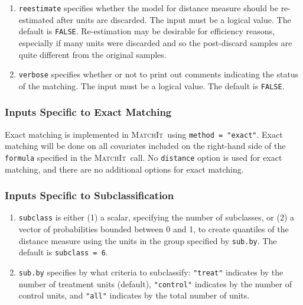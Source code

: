 \documentclass[oneside,letterpaper,titlepage]{article}
\newcommand{\MatchIt}{\textsc{MatchIt}}
\begin{document}
\begin{enumerate}
\item \texttt{reestimate} specifies whether the model for distance
  measure should be re-estimated after units are discarded. The input
  must be a logical value. The default is \texttt{FALSE}.
  Re-estimation may be desirable for efficiency reasons, especially if
  many units were discarded and so the post-discard samples are quite
  different from the original samples.

\item \texttt{verbose} specifies whether or not to print out comments
  indicating the status of the matching. The input must be a logical
  value. The default is \texttt{FALSE}.
\end{enumerate}

\subsubsection{Inputs Specific to Exact Matching}

Exact matching is implemented in \MatchIt\ using \texttt{method =
  "exact"}.  Exact matching will be done on all covariates included on
the right-hand side of the \texttt{formula} specified in the \MatchIt\
call.  No \texttt{distance} option is used for exact matching, and
there are no additional options for exact matching.

\subsubsection{Inputs Specific to Subclassification}

\begin{enumerate}
\item \texttt{subclass} is either (1) a scalar, specifying the number
  of subclasses, or (2) a vector of probabilities bounded between 0
  and 1, to create quantiles of the distance measure using the units
  in the group specified by \texttt{sub.by}.  The default is
  \texttt{subclass = 6}.
\item \texttt{sub.by} specifies by what criteria to subclassify:
  \texttt{"treat"} indicates by the number of treatment units
  (default), \texttt{"control"} indicates by the number of control
  units, and \texttt{"all"} indicates by the total number of units.
\end{enumerate}
\end{document}
